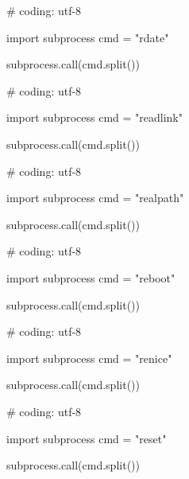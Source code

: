 \begin{mylisting}[label={lst:acpid},language=sh,caption=rdate]

# coding: utf-8

import subprocess
cmd = "rdate"

subprocess.call(cmd.split())

\end{mylisting}

\begin{mylisting}[label={lst:acpid},language=sh,caption=readlink]

# coding: utf-8

import subprocess
cmd = "readlink"

subprocess.call(cmd.split())

\end{mylisting}

\begin{mylisting}[label={lst:acpid},language=sh,caption=realpath]

# coding: utf-8

import subprocess
cmd = "realpath"

subprocess.call(cmd.split())

\end{mylisting}

\begin{mylisting}[label={lst:acpid},language=sh,caption=reboot]

# coding: utf-8

import subprocess
cmd = "reboot"

subprocess.call(cmd.split())

\end{mylisting}

\begin{mylisting}[label={lst:acpid},language=sh,caption=renice]

# coding: utf-8

import subprocess
cmd = "renice"

subprocess.call(cmd.split())

\end{mylisting}

\begin{mylisting}[label={lst:acpid},language=sh,caption=reset]

# coding: utf-8

import subprocess
cmd = "reset"

subprocess.call(cmd.split())

\end{mylisting}

